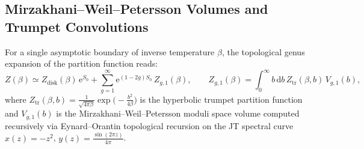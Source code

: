 \documentclass[11pt,a4paper,reqno]{article}
\theoremstyle{plain}
\theoremstyle{definition}
\theoremstyle{remark}
\numberwithin{equation}{section}
\begin{document}
\subsection{Mirzakhani--Weil--Petersson Volumes and Trumpet Convolutions}
For a single asymptotic boundary of inverse temperature $\beta$, the topological genus expansion of the partition function reads:
\begin{equation}
\label{eq:sss_genus_expansion}
Z(\beta) \simeq Z_{\mathrm{disk}}(\beta)\,\mathrm{e}^{S_0} + \sum_{g=1}^{\infty} \mathrm{e}^{(1-2g)S_0}\, Z_{g,1}(\beta), \qquad
Z_{g,1}(\beta) = \int_0^\infty b\,\mathrm{d}b\, Z_{\mathrm{tr}}(\beta, b)\, V_{g,1}(b),
\end{equation}
where $Z_{\mathrm{tr}}(\beta, b) = \frac{1}{\sqrt{4\pi\beta}}\exp\!\bigl(-\frac{b^2}{4\beta}\bigr)$ is the hyperbolic trumpet partition function and $V_{g,1}(b)$ is the Mirzakhani--Weil--Petersson moduli space volume computed recursively via Eynard--Orantin topological recursion on the JT spectral curve $x(z) = -z^2$, $y(z) = \frac{\sin(2\pi z)}{4\pi}$.
\end{document}
